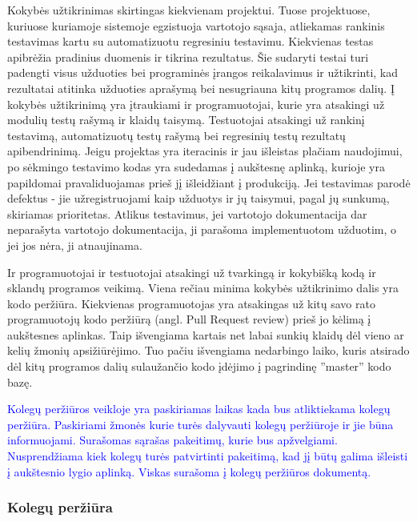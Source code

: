 \documentclass{VUMIFPSkursinis}
\begin{document}
	Kokybės užtikrinimas skirtingas kiekvienam projektui.
	Tuose projektuose, kuriuose kuriamoje sistemoje egzistuoja vartotojo sąsaja, atliekamas rankinis testavimas kartu su automatizuotu regresiniu testavimu. Kiekvienas testas apibrėžia pradinius duomenis ir tikrina rezultatus. Šie sudaryti testai turi padengti visus užduoties bei programinės įrangos reikalavimus ir užtikrinti, kad rezultatai atitinka užduoties aprašymą bei nesugriauna kitų programos dalių.
	Į kokybės užtikrinimą yra įtraukiami ir programuotojai, kurie yra atsakingi už modulių testų rašymą ir klaidų taisymą.
	Testuotojai atsakingi už rankinį testavimą, automatizuotų testų rašymą bei regresinių testų rezultatų apibendrinimą.
	Jeigu projektas yra iteracinis ir jau išleistas plačiam naudojimui, po sėkmingo testavimo kodas yra sudedamas į aukštesnę aplinką, kurioje yra papildomai pravaliduojamas prieš jį išleidžiant į produkciją.
	Jei testavimas parodė defektus - jie užregistruojami kaip užduotys ir jų taisymui, pagal jų sunkumą, skiriamas prioritetas. 
Atlikus testavimus, jei vartotojo dokumentacija dar neparašyta vartotojo dokumentacija, ji parašoma implementuotom užduotim, o jei jos nėra, ji atnaujinama.
	\par
	Ir programuotojai ir testuotojai atsakingi už tvarkingą ir kokybišką kodą ir sklandų programos veikimą.
	Viena rečiau minima kokybės užtikrinimo dalis yra kodo peržiūra.
	Kiekvienas programuotojas yra atsakingas už kitų savo rato programuotojų kodo peržiūrą (angl. Pull Request review) prieš jo kėlimą į aukštesnes aplinkas.
	Taip išvengiama kartais net labai sunkių klaidų dėl vieno ar kelių žmonių apsižiūrėjimo.
	Tuo pačiu išvengiama nedarbingo laiko, kuris atsirado dėl kitų programos dalių sulaužančio kodo įdėjimo į pagrindinę ''master'' kodo bazę.

	\textcolor{blue}{Kolegų peržiūros veikloje yra paskiriamas laikas kada bus atliktiekama kolegų peržiūra.
				Paskiriami žmonės kurie turės dalyvauti kolegų peržiūroje ir jie būna informuojami.
				Surašomas sąrašas pakeitimų, kurie bus apžvelgiami.
				Nusprendžiama kiek kolegų turės patvirtinti pakeitimą, kad jį būtų galima išleisti į aukštesnio lygio aplinką.
				Viskas surašoma į kolegų peržiūros dokumentą.}

	\newpage
	\subsubsection{Kolegų peržiūra}
\end{document}
